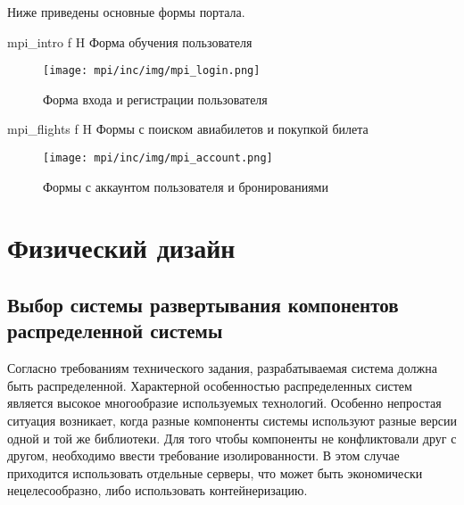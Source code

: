 Ниже приведены основные формы портала. 
\newpage


{mpi_intro} %
{f} %
{H} %
{\textwidth} %
{Форма обучения пользователя} %



\begin{figure}[h!]
  \centering
  \texttt{[image: mpi/inc/img/mpi\_login.png]}
  \caption{Форма входа и регистрации пользователя}
  \label{fig:scheme}
\end{figure}


{mpi_flights} %
{f} %
{H} %
{\textwidth} %
{Формы с поиском авиабилетов и покупкой билета} %


\begin{figure}[h!]
  \centering
  \texttt{[image: mpi/inc/img/mpi\_account.png]}
  \caption{Формы с аккаунтом пользователя и бронированиями}
  \label{fig:scheme}
\end{figure}


\section*{Физический дизайн}

\subsection*{Выбор системы развертывания компонентов распределенной системы}

Согласно требованиям технического задания, разрабатываемая система должна быть распределенной. Характерной особенностью распределенных систем является высокое многообразие используемых технологий. Особенно непростая ситуация возникает, когда разные компоненты системы используют разные версии одной и той же библиотеки. Для того чтобы компоненты не конфликтовали друг с другом, необходимо ввести требование изолированности. В этом случае приходится использовать отдельные серверы, что может быть экономически нецелесообразно, либо использовать контейнеризацию. 

